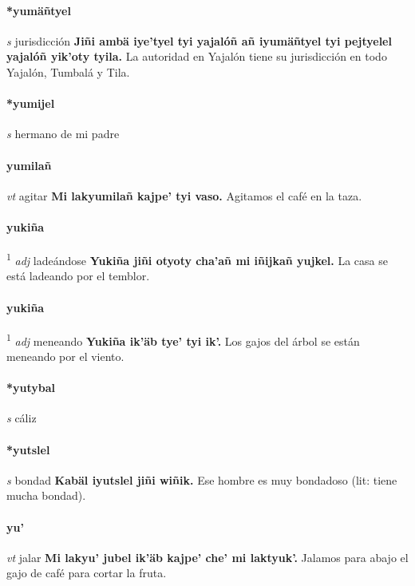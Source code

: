 \documentclass{scrbook}
\newcommand{\entry}[1]{\paragraph{#1}}
\newcommand{\defsuperscript}[1]{\textsuperscript{1}}
\newcommand{\partofspeech}[1]{\textit{#1}}
\newcommand{\spanishtranslation}[1]{#1}
\newcommand{\cholexample}[1]{\textbf{#1}}
\newcommand{\exampletranslation}[1]{#1}
\begin{document}
\begin{multicols}{2}
\entry{*yumäñtyel}
\partofspeech{s}
\spanishtranslation{jurisdicción}
\cholexample{Jiñi ambä iye'tyel tyi yajalóñ añ iyumäñtyel tyi pejtyelel yajalóñ yik'oty tyila.}
\exampletranslation{La autoridad en Yajalón tiene su jurisdicción en todo Yajalón, Tumbalá y Tila.}

\entry{*yumijel}
\partofspeech{s}
\spanishtranslation{hermano de mi padre}

\entry{yumilañ}
\partofspeech{vt}
\spanishtranslation{agitar}
\cholexample{Mi lakyumilañ kajpe' tyi vaso.}
\exampletranslation{Agitamos el café en la taza.}

\entry{yukiña}
\defsuperscript{1}
\partofspeech{adj}
\spanishtranslation{ladeándose}
\cholexample{Yukiña jiñi otyoty cha'añ mi iñijkañ yujkel.}
\exampletranslation{La casa se está ladeando por el temblor.}

\entry{yukiña}
\defsuperscript{2}
\partofspeech{adj}
\spanishtranslation{meneando}
\cholexample{Yukiña ik'äb tye' tyi ik'.}
\exampletranslation{Los gajos del árbol se están meneando por el viento.}

\entry{*yutybal}
\partofspeech{s}
\spanishtranslation{cáliz}

\entry{*yutslel}
\partofspeech{s}
\spanishtranslation{bondad}
\cholexample{Kabäl iyutslel jiñi wiñik.}
\exampletranslation{Ese hombre es muy bondadoso (lit: tiene mucha bondad).}

\entry{yu'}
\partofspeech{vt}
\spanishtranslation{jalar}
\cholexample{Mi lakyu' jubel ik'äb kajpe' che' mi laktyuk'.}
\exampletranslation{Jalamos para abajo el gajo de café para cortar la fruta.}
\end{multicols}
\end{document}
